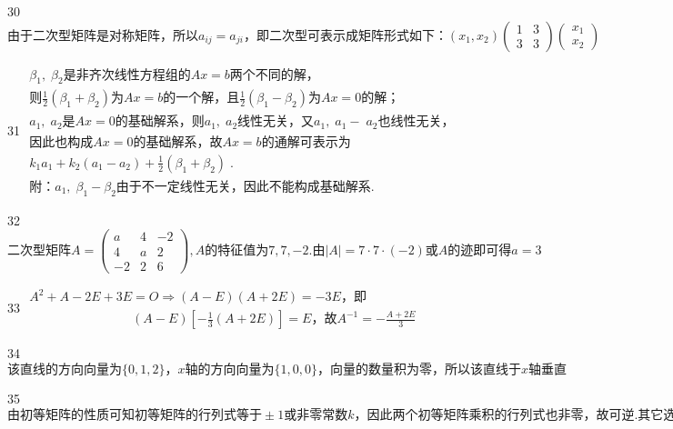 30
$\mathrm{由于二次型矩阵是对称矩阵}，\mathrm{所以}a_{ij}=a_{ji}，\mathrm{即二次型可表示成矩阵形式如下}：(x_1,x_2)\begin{pmatrix}1&3\\3&3\end{pmatrix}\begin{pmatrix}x_1\\x_2\end{pmatrix}$


31
$\begin{array}{l}\beta_1,\;\beta_2\mathrm{是非齐次线性方程组的}Ax=b\mathrm{两个不同的解}，\\则\frac12\left(\beta_1+\beta_2\right)为Ax=b\mathrm{的一个解}，且\frac12\left(\beta_1-\beta_2\right)为Ax=0\mathrm{的解}；\;\;\\a_1,\;a_2是Ax=0\mathrm{的基础解系}，则a_1,\;a_2\mathrm{线性无关}，又a_1,\;a_1-\;a_2\mathrm{也线性无关}，\\\mathrm{因此也构成}Ax=0\mathrm{的基础解系}，故Ax=b\mathrm{的通解可表示为}\\k_1a_1+k_2\left(a_1-a_2\right)+\frac12\left(\beta_1+\beta_2\right)\;.\;\;\\附：a_1,\;\beta_1-\beta_2\mathrm{由于不一定线性无关}，\mathrm{因此不能构成基础解系}.\end{array}$


32
$\mathrm{二次型矩阵}A=\begin{pmatrix}a&4&-2\\4&a&2\\-2&2&6\end{pmatrix},A\mathrm{的特征值为}7,7,-2.由\left|A\right|=7\cdot7\cdot(-2)或A\mathrm{的迹即可得}a=3$


33
$\begin{array}{l}A^2+A-2E+3E=O\Rightarrow\left(A-E\right)\left(A+2E\right)=-3E，即\\\;\;\;\;\;\;\;\;\;\;\;\;\;\;\;\;\;\;\;\;\;\;\;\;\;\;\;\;\;\left(A-E\right)\left[-\frac13\left(A+2E\right)\right]=E，故A^{-1}=-\frac{A+2E}3\end{array}$


34
$\mathrm{该直线的方向向量为}\{0,1,2\}，x\mathrm{轴的方向向量为}\{1,0,0\}，\mathrm{向量的数量积为零}，\mathrm{所以该直线于}x\mathrm{轴垂直}$


35
$\mathrm{由初等矩阵的性质可知初等矩阵的行列式等于}\pm1\mathrm{或非零常数}k，\mathrm{因此两个初等矩阵乘积的行列式也非零}，\mathrm{故可逆}.\mathrm{其它选项不能确定}.$


